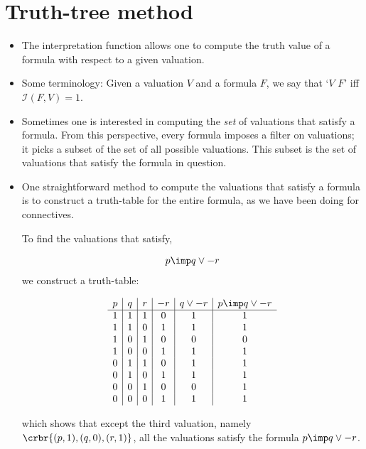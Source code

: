 \documentclass[11pt]{article}
\begin{document}
\section{Truth-tree method}

\begin{itemize}

\item The interpretation function allows one to compute the truth value of a
formula with respect to a given valuation.

\item Some terminology: Given a valuation $V$ and a formula $F$, we say that
`$V$  $F$'
iff $\mathcal{I}(F,V)= 1$. 

\item Sometimes one is interested in computing the \emph{set} of valuations that satisfy a formula. From this perspective, every formula imposes a filter on valuations; it picks a subset of the set of all possible valuations. This subset is the set of valuations that satisfy the formula in question.

\item One straightforward method to compute the valuations that satisfy a formula is to construct a truth-table for the entire formula, as we have been doing for connectives. 

\hrulefill
\begin{uexample}
To find the valuations that satisfy,  

\begin{align}\label{ttex}
p\imp q\lor -r
\end{align}
we construct a truth-table:

\[
\begin{array}{c|c|c|c|c|c}
p & q & r & -r & q\lor -r& p\imp q\lor -r\\ \hline
 1&1 & 1&0 &1 &1 \\
 1&1 & 0&1 &1 &1 \\
 1&0 & 1&0 &0 &0 \\
 1&0 & 0&1 &1 &1 \\
 0&1 & 1&0 &1 &1 \\
 0&1 & 0&1 &1 &1 \\
 0&0 & 1&0 &0 &1 \\
 0&0 & 0&1 &1 &1 
\end{array}
\]

which shows that except the third valuation, namely $\crbr{(p,1),(q,0),(r,1)}$,
all the valuations satisfy the formula $p\imp q\lor -r$.


\end{uexample}
\end{itemize}
\end{document}

